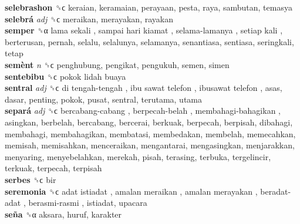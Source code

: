 \textbf{selebrashon} ␝ϲ  keraian, keramaian, perayaan, pesta, raya, sambutan, temasya  \\
\textbf{selebrá} \emph{adj}  ␝ϲ  meraikan, merayakan, rayakan  \\
\textbf{semper} ␝α   lama sekali ,  sampai hari kiamat ,  selama-lamanya ,  setiap kali , berterusan, pernah, selalu, selalunya, selamanya, senantiasa, sentiasa, seringkali, tetap  \\
\textbf{semènt} \emph{n}  ␝ϲ  penghubung, pengikat, pengukuh, semen, simen  \\
\textbf{sentebibu} ␝ϲ   pokok lidah buaya   \\
\textbf{sentral} \emph{adj}  ␝ϲ   di tengah-tengah ,  ibu sawat telefon ,  ibusawat telefon , asas, dasar, penting, pokok, pusat, sentral, terutama, utama  \\
\textbf{separá} \emph{adj}  ␝ϲ   bercabang-cabang ,  berpecah-belah ,  membahagi-bahagikan , asingkan, berbelah, bercabang, bercerai, berkuak, berpecah, berpisah, dibahagi, membahagi, membahagikan, membatasi, membedakan, membelah, memecahkan, memisah, memisahkan, menceraikan, mengantarai, mengasingkan, menjarakkan, menyaring, menyebelahkan, merekah, pisah, terasing, terbuka, tergelincir, terkuak, terpecah, terpisah  \\
\textbf{serbes} ␝ϲ  bir  \\
\textbf{seremonia} ␝ϲ   adat istiadat ,  amalan meraikan ,  amalan merayakan ,  beradat-adat ,  berasmi-rasmi , istiadat, upacara  \\
\textbf{seña} ␝α  aksara, huruf, karakter  \\
